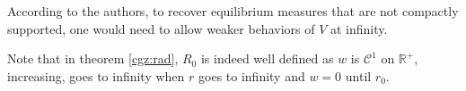 \documentclass[a4paper,12pt]{report}
\begin{document}
According to the authors, to recover equilibrium measures that are not compactly supported, one would need to allow weaker behaviors of $V$ at infinity.
\vspace{0.5cm}

Note that in theorem \ref{cgz:rad}, $R_0$ is indeed well defined as $w$ is $\mathcal{C}^{1}$ on $\mathbb{R}^{+}$, increasing, goes to infinity when $r$ goes to infinity and $w = 0$ until $r_0$.




\end{document}
